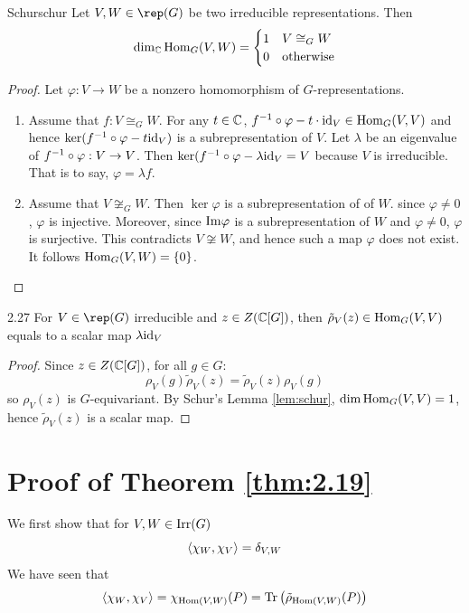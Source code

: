 \documentclass[twoside = false,	%
		headsepline,		%
		parskip = true,
		]{scrbook}						%
\begin{document}
    \begin{lemma}{Schur}{schur}
        Let $V,W \in \rep(G)$ be two irreducible representations. Then
        $$\dim_\mathbb C\mathrm{Hom}_G(V,W)=\begin{cases}
            1 & V\cong_G W\\
            0 & \text{otherwise}
        \end{cases}$$
    \end{lemma}
    \begin{proof}
        Let $\varphi: V \to W$  be a nonzero homomorphism of $G$-representations.
        \begin{enumerate}
            \item Assume that $f:V\cong_G W$. For any $t\in\mathbb C$, $f^{-1}\circ\varphi-t\cdot\mathrm{id}_V\in\mathrm{Hom}_G(V,V)$ and hence $\ker(f^{-1}\circ\varphi-t\mathrm{id}_V)$ is a subrepresentation of $V$. Let $\lambda$ be an eigenvalue of $f^{-1}\circ\varphi:V\to V$. Then $\ker(f^{-1}\circ\varphi-\lambda\mathrm{id}_V=V$ because $V$ is irreducible. That is to say, $\varphi=\lambda f$.
            \item Assume that $V\not\cong_G W$. Then $\ker\varphi$ is a subrepresentation of of $W$. since $\varphi\neq 0$, $\varphi$ is injective. Moreover, since $\mathrm{Im}\varphi$ is a subrepresentation of $W$ and $\varphi\neq 0$, $\varphi$ is surjective. This contradicts $V\not\cong W$, and hence such a map $\varphi$ does not exist. It follows $\mathrm{Hom}_G(V,W)=\left\{ 0\right\}$.
        \end{enumerate}
    \end{proof}
    \begin{corollary}{}{2.27}
        For $V\in\rep(G)$ irreducible and $z\in Z(\mathbb C[G])$, then $\tilde\rho_V(z) \in \mathrm{Hom}_G(V,V)$ equals to a scalar map $\lambda\mathrm{id}_V$
    \end{corollary}

    \begin{proof}
        Since $z \in Z(\mathbb C[G])$, for all $g \in G:$
        \begin{equation*}
            \rho_V(g) \tilde \rho_V(z) = \tilde \rho_V(z) \rho_V(g)
        \end{equation*}
        so $\rho_V(z)$ is $G$-equivariant. By Schur's Lemma \ref{lem:schur}, $\dim \mathrm{Hom}_G(V,V) = 1$, hence $\tilde \rho_V(z)$ is a scalar map.
    \end{proof}
    
\section{Proof of Theorem \ref{thm:2.19}}
    We first show that for $V,W\in\mathrm{Irr}(G)$ $$\left\langle \chi_W,\chi_V\right\rangle=\delta_{V,W}$$
    We have seen that $$\left\langle \chi_W,\chi_V\right\rangle=\chi_{\mathrm{Hom}(V,W)}(P)=\mathrm{Tr}\left( \tilde\rho_{\mathrm{Hom}(V,W)}(P)\right)$$
\end{document}
